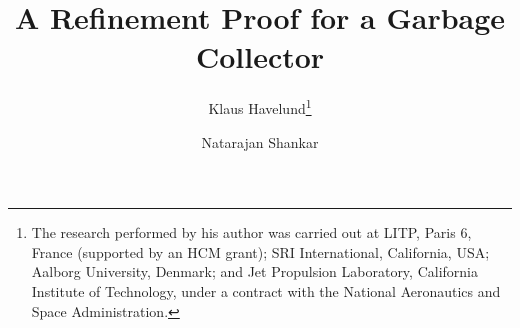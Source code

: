 \documentclass{llncs}
\begin{document}
\title{A Refinement Proof for a Garbage Collector}

\author{ 
Klaus Havelund\thanks{The research 
performed by his author was carried out at
LITP, Paris 6, France (supported by an HCM grant); 
SRI International, California, USA;
Aalborg University, Denmark;
and Jet Propulsion Laboratory, California 
Institute of Technology, under a contract with the National Aeronautics 
and Space Administration.}
\and
Natarajan Shankar
}






\maketitle














\appendix
{}


\end{document}
